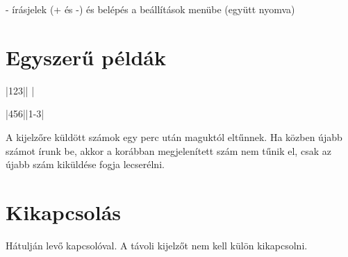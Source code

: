 \documentclass{article}
\begin{document}
\keys{{+}}-\keys{{-}} írásjelek (+ és -) és belépés a beállítások menübe (együtt nyomva)

\section*{Egyszerű példák}

   \keys{ } \hfill {}|123||   |

     \keys{-}  \keys{ } \hfill {}|456||1-3|


A kijelzőre küldött számok egy perc után maguktól eltűnnek. Ha közben újabb számot írunk be, akkor a korábban megjelenített szám nem tűnik el, csak az újabb szám kiküldése fogja lecserélni.

\section*{Kikapcsolás}

Hátulján levő kapcsolóval. A távoli kijelzőt nem kell külön kikapcsolni.


\end{document}
